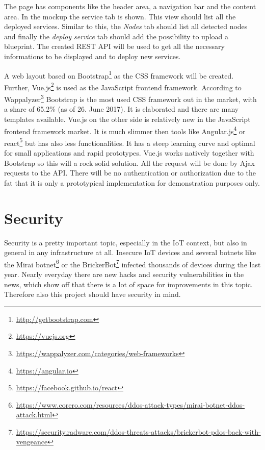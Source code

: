 The page has components like the header area, a navigation bar and the content area.
In the mockup the service tab is shown.
This view should list all the deployed services.
Similar to this, the \textit{Nodes} tab should list all detected nodes and finally the \textit{deploy service} tab should add the possibility to upload a blueprint.
The created \ac{REST} \ac{API} will be used to get all the necessary informations to be displayed and to deploy new services.

A web layout based on Bootstrap\footnote{\url{http://getbootstrap.com}} as the \ac{CSS} framework will be created.
Further, Vue.js\footnote{\url{https://vuejs.org}} is used as the JavaScript frontend framework.
According to Wappalyzer\footnote{\url{https://wappalyzer.com/categories/web-frameworks}} Bootstrap is the most used \ac{CSS} framework out in the market, with a share of 65.2\% (as of 26. June 2017).
It is elaborated and there are many templates available.
Vue.js on the other side is relatively new in the JavaScript frontend framework market.
It is much slimmer then tools like Angular.js\footnote{\url{https://angular.io}} or react\footnote{\url{https://facebook.github.io/react}} but has also less functionalities.
It has a steep learning curve and optimal for small applications and rapid prototypes.
Vue.js works natively together with Bootstrap so this will a rock solid solution.
All the request will be done by Ajax requests to the \ac{API}.
There will be no authentication or authorization due to the fat that it is only a prototypical implementation for demonstration purposes only.


\section{Security}
Security is a pretty important topic, especially in the \ac{IoT} context, but also in general in any infrastructure at all.
Insecure \ac{IoT} devices and several botnets like the Mirai botnet\footnote{\url{https://www.corero.com/resources/ddos-attack-types/mirai-botnet-ddos-attack.html}} or the BrickerBot\footnote{\url{https://security.radware.com/ddos-threats-attacks/brickerbot-pdos-back-with-vengeance}} infected thousands of devices during the last year.
Nearly everyday there are new hacks and security vulnerabilities in the news, which show off that there is a lot of space for improvements in this topic.
Therefore also this project should have security in mind.

